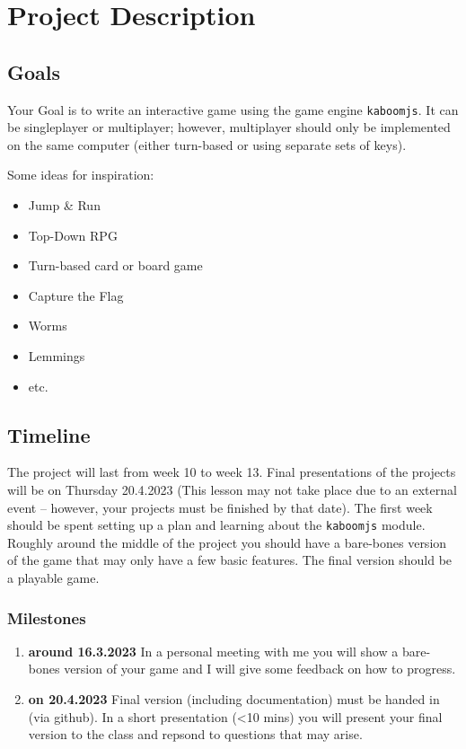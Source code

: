 \documentclass[11pt,a4paper]{report}
\begin{document}
\section{Project Description}

\subsection{Goals} 
Your Goal is to write an interactive game using the game engine \verb|kaboomjs|. It can be singleplayer or multiplayer; however, multiplayer should only be implemented on the same computer (either turn-based or using separate sets of keys).

Some ideas for inspiration:
\begin{itemize}
\item Jump \& Run
\item Top-Down RPG
\item Turn-based card or board game
\item Capture the Flag
\item Worms
\item Lemmings
\item etc.
\end{itemize}
\subsection{Timeline}
The project will last from week 10 to week 13. Final presentations of the projects will be on Thursday 20.4.2023 (This lesson may not take place due to an external event -- however, your projects must be finished by that date). The first week should be spent setting up a plan and learning about the \verb|kaboomjs| module. Roughly around the middle of the project you should have a bare-bones version of the game that may only have a few basic features. The final version should be a playable game.


\subsubsection{Milestones}
\begin{enumerate}
\item {\bf around 16.3.2023} In a personal meeting with me you will show a bare-bones version of your game and I will give some feedback on how to progress.
\item {\bf on 20.4.2023} Final version (including documentation) must be handed in (via github). In a short presentation (<10 mins) you will present your final version to the class and repsond to questions that may arise.
\end{enumerate}
\end{document}
